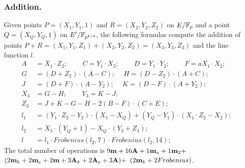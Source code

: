 \subsubsection{Addition.}
Given points $P = (X_1,Y_1,1)$ and $R = (X_2,Y_2,Z_2)$ on $E/\mathbb{F}_{p}$ and a point $Q = (X_Q,Y_Q,1)$ on $E'/\mathbb{F}_{p^{k/d}}$,
the following formulas compute the addition of points $P + R = (X_1,Y_1,Z_1) + (X_2,Y_2,Z_2) = (X_3,Y_3,Z_3)$ and the line function $l$.
\begin{align*}
A &= X_1 \cdot Z_2;\	\qquad
C = Y_1 \cdot X_2;\	\qquad
D = Y_1 \cdot Y_2;\	\qquad
F = a X_1 \cdot X_2;\\
G &= (D + Z_2) \cdot (A - C);\	\quad
H = (D - Z_2) \cdot (A + C);\\
J &= (D + F) \cdot (A - Y_2);\	\quad
K = (D - F) \cdot (A + Y_2);\\
X_3 &= G - H;\	\qquad
Y_3 = K - J;\\
Z_3 &= J + K - G - H - 2(B - F) \cdot (C + E);\\
l_1 &= (Y_1 \cdot Z_2 - Y_2) \cdot (X_1 - X_Q) + (Y_Q - Y_1) \cdot (X_1 \cdot Z_2 - X_2);\\
l_2 &= X_3 \cdot (Y_Q + 1) - X_Q \cdot (Y_3 + Z_3);\\
l &= l_1 \cdot Frobenius(l_2,7) \cdot Frobenius(l_2,14);
\end{align*}
The total number of operations is
$ 9\textbf{m} +16\textbf{A} + 1\textbf{m}_{a} + 1\textbf{m}_{2} + $
$ (2\textbf{m}_k + 2\textbf{m}_e + 2\textbf{m} + 3\textbf{A}_k + 2\textbf{A}_e + 3\textbf{A}) + $
$ (2\textbf{m}_k + 2Frobenius)$.

